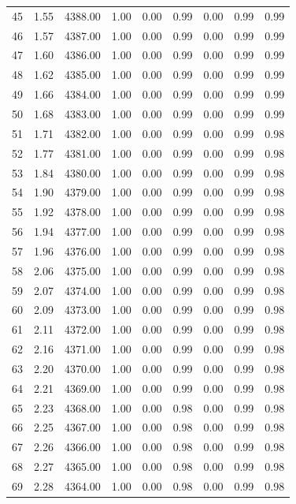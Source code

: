 \documentclass{article}\usepackage[]{graphicx}\usepackage[]{color}
\begin{document}
\begin{longtable}{rrrrrrrrr}
  45 & 1.55 & 4388.00 & 1.00 & 0.00 & 0.99 & 0.00 & 0.99 & 0.99 \\ 
  46 & 1.57 & 4387.00 & 1.00 & 0.00 & 0.99 & 0.00 & 0.99 & 0.99 \\ 
  47 & 1.60 & 4386.00 & 1.00 & 0.00 & 0.99 & 0.00 & 0.99 & 0.99 \\ 
  48 & 1.62 & 4385.00 & 1.00 & 0.00 & 0.99 & 0.00 & 0.99 & 0.99 \\ 
  49 & 1.66 & 4384.00 & 1.00 & 0.00 & 0.99 & 0.00 & 0.99 & 0.99 \\ 
  50 & 1.68 & 4383.00 & 1.00 & 0.00 & 0.99 & 0.00 & 0.99 & 0.99 \\ 
  51 & 1.71 & 4382.00 & 1.00 & 0.00 & 0.99 & 0.00 & 0.99 & 0.98 \\ 
  52 & 1.77 & 4381.00 & 1.00 & 0.00 & 0.99 & 0.00 & 0.99 & 0.98 \\ 
  53 & 1.84 & 4380.00 & 1.00 & 0.00 & 0.99 & 0.00 & 0.99 & 0.98 \\ 
  54 & 1.90 & 4379.00 & 1.00 & 0.00 & 0.99 & 0.00 & 0.99 & 0.98 \\ 
  55 & 1.92 & 4378.00 & 1.00 & 0.00 & 0.99 & 0.00 & 0.99 & 0.98 \\ 
  56 & 1.94 & 4377.00 & 1.00 & 0.00 & 0.99 & 0.00 & 0.99 & 0.98 \\ 
  57 & 1.96 & 4376.00 & 1.00 & 0.00 & 0.99 & 0.00 & 0.99 & 0.98 \\ 
  58 & 2.06 & 4375.00 & 1.00 & 0.00 & 0.99 & 0.00 & 0.99 & 0.98 \\ 
  59 & 2.07 & 4374.00 & 1.00 & 0.00 & 0.99 & 0.00 & 0.99 & 0.98 \\ 
  60 & 2.09 & 4373.00 & 1.00 & 0.00 & 0.99 & 0.00 & 0.99 & 0.98 \\ 
  61 & 2.11 & 4372.00 & 1.00 & 0.00 & 0.99 & 0.00 & 0.99 & 0.98 \\ 
  62 & 2.16 & 4371.00 & 1.00 & 0.00 & 0.99 & 0.00 & 0.99 & 0.98 \\ 
  63 & 2.20 & 4370.00 & 1.00 & 0.00 & 0.99 & 0.00 & 0.99 & 0.98 \\ 
  64 & 2.21 & 4369.00 & 1.00 & 0.00 & 0.99 & 0.00 & 0.99 & 0.98 \\ 
  65 & 2.23 & 4368.00 & 1.00 & 0.00 & 0.98 & 0.00 & 0.99 & 0.98 \\ 
  66 & 2.25 & 4367.00 & 1.00 & 0.00 & 0.98 & 0.00 & 0.99 & 0.98 \\ 
  67 & 2.26 & 4366.00 & 1.00 & 0.00 & 0.98 & 0.00 & 0.99 & 0.98 \\ 
  68 & 2.27 & 4365.00 & 1.00 & 0.00 & 0.98 & 0.00 & 0.99 & 0.98 \\ 
  69 & 2.28 & 4364.00 & 1.00 & 0.00 & 0.98 & 0.00 & 0.99 & 0.98 \\ 

\end{longtable}
\end{document}
